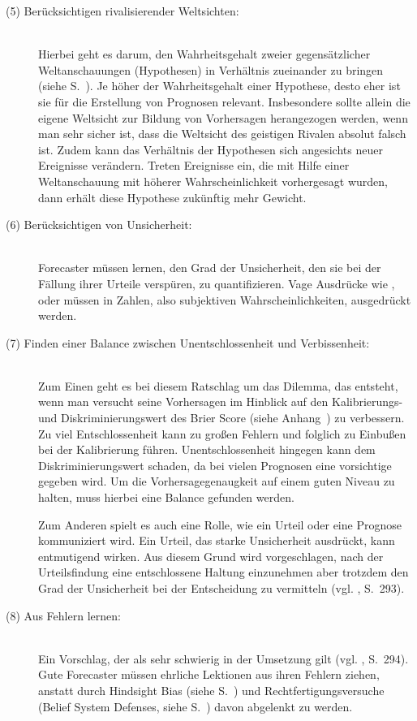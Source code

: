 \begin{description}
\item[(5) Berücksichtigen rivalisierender Weltsichten:] \hfill \\
Hierbei geht es darum, den Wahrheitsgehalt zweier gegensätzlicher Weltanschauungen (Hypothesen) in Verhältnis zueinander zu bringen (siehe S.~\xcom).
Je höher der Wahrheitsgehalt einer Hypothese, desto eher ist sie für die Erstellung von Prognosen relevant. Insbesondere
sollte allein die eigene Weltsicht zur Bildung von Vorhersagen herangezogen werden, wenn man sehr sicher ist, dass die Weltsicht des
geistigen Rivalen absolut falsch ist. Zudem kann das Verhältnis der Hypothesen sich angesichts neuer Ereignisse verändern.
Treten Ereignisse ein, die mit Hilfe einer Weltanschauung mit höherer Wahrscheinlichkeit vorhergesagt wurden, dann erhält diese
Hypothese zukünftig mehr Gewicht.

\item[(6) Berücksichtigen von Unsicherheit:] \hfill \\
Forecaster müssen lernen, den Grad der Unsicherheit, den sie bei der Fällung ihrer Urteile verspüren, zu quantifizieren.
Vage Ausdrücke wie \grqq{}, \grqq{} oder \grqq{} müssen in
Zahlen, also subjektiven Wahrscheinlichkeiten, ausgedrückt werden.

\item[(7) Finden einer Balance zwischen Unentschlossenheit und Verbissenheit:] \hfill \\
Zum Einen geht es bei diesem Ratschlag um das Dilemma, das entsteht, wenn man versucht seine Vorhersagen im Hinblick auf
den Kalibrierungs- und Diskriminierungswert des Brier Score (siehe Anhang~\xcom) zu verbessern. Zu viel Entschlossenheit
kann zu großen Fehlern und folglich zu Einbußen bei der Kalibrierung führen. Unentschlossenheit hingegen kann dem
Diskriminierungswert schaden, da bei vielen Prognosen eine vorsichtige \grqq{} gegeben wird. Um
die Vorhersagegenaugkeit auf einem guten Niveau zu halten, muss hierbei eine Balance gefunden werden.

Zum Anderen spielt es auch eine Rolle, wie ein Urteil oder eine Prognose kommuniziert wird. Ein Urteil, das starke
Unsicherheit ausdrückt, kann entmutigend wirken. Aus diesem Grund wird vorgeschlagen, nach der Urteilsfindung
eine entschlossene Haltung einzunehmen aber trotzdem den Grad der Unsicherheit bei der Entscheidung zu vermitteln
(vgl. \cite{Jackson}, S.~293).

\item[(8) Aus Fehlern lernen:] \hfill \\
Ein Vorschlag, der als sehr schwierig in der Umsetzung gilt (vgl. \cite{Jackson}, S.~294). Gute Forecaster müssen
ehrliche Lektionen aus ihren Fehlern ziehen, anstatt durch Hindsight Bias (siehe S.~\xcom) und Rechtfertigungsversuche
(Belief System Defenses, siehe S.~\xcom) davon abgelenkt zu werden.


\end{description}
